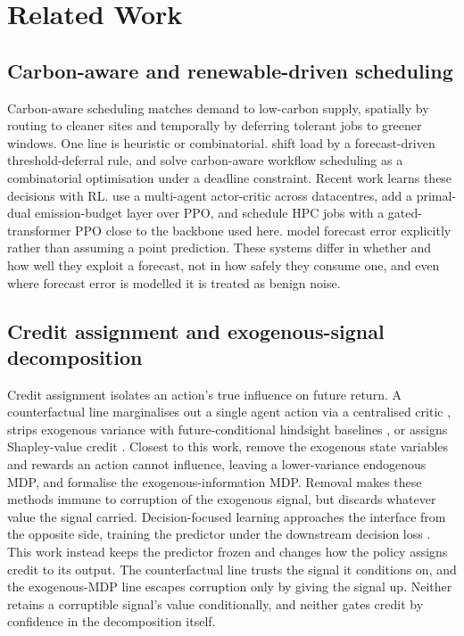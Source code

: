 \documentclass{article} %
\begin{document}
\section{Related Work}
\label{sec:related}
\subsection{Carbon-aware and renewable-driven scheduling}
Carbon-aware scheduling matches demand to low-carbon supply, spatially by routing to cleaner sites and temporally by deferring tolerant jobs to greener windows. One line is heuristic or combinatorial. \citet{wiesnerLetsWaitAwhile2021} shift load by a forecast-driven threshold-deferral rule, and \citet{schweisgutCarbonAwareWorkflowScheduling2025} solve carbon-aware workflow scheduling as a combinatorial optimisation under a deadline constraint. Recent work learns these decisions with RL. \citet{jayanettiMultiAgentDeepReinforcement2024} use a multi-agent actor-critic across datacentres, \citet{alqithamiEcoFairCHMARLScalableConstrained2025a} add a primal-dual emission-budget layer over PPO, and \citet{gaoSelfAttentionMechanismsHPC2025} schedule HPC jobs with a gated-transformer PPO close to the backbone used here. \citet{yuCarbonEfficientDataCenter2025} model forecast error explicitly rather than assuming a point prediction. These systems differ in whether and how well they exploit a forecast, not in how safely they consume one, and even where forecast error is modelled it is treated as benign noise.

\subsection{Credit assignment and exogenous-signal decomposition}
Credit assignment isolates an action's true influence on future return. A counterfactual line marginalises out a single agent action via a centralised critic \citep{foersterCounterfactualMultiAgentPolicy2018}, strips exogenous variance with future-conditional hindsight baselines \citep{mesnard2020counterfactual, harutyunyanHindsightCreditAssignment2019}, or assigns Shapley-value credit \citep{liShapleyCounterfactualCredits2021}. Closest to this work, \citet{dietterich2018discovering} remove the exogenous state variables and rewards an action cannot influence, leaving a lower-variance endogenous MDP, and \citet{efroni2022sample} formalise the exogenous-information MDP. Removal makes these methods immune to corruption of the exogenous signal, but discards whatever value the signal carried. Decision-focused learning approaches the interface from the opposite side, training the predictor under the downstream decision loss \citep{elmachtoub2022smart, wilder2019melding}. This work instead keeps the predictor frozen and changes how the policy assigns credit to its output. The counterfactual line trusts the signal it conditions on, and the exogenous-MDP line escapes corruption only by giving the signal up. Neither retains a corruptible signal's value conditionally, and neither gates credit by confidence in the decomposition itself.
\end{document}
